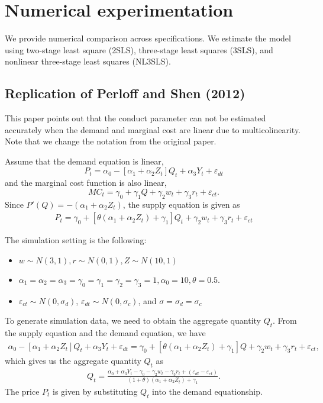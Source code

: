 \documentclass[11pt, a4paper]{article}
\begin{document}
\section{Numerical experimentation}
We provide numerical comparison across specifications. We estimate the model using two-stage least square (2SLS), three-stage least
squares (3SLS), and nonlinear three-stage least squares (NL3SLS).
    
\subsection{Replication of Perloff and Shen (2012)}
This paper points out that the conduct parameter can not be estimated accurately when the demand and marginal cost are linear due to multicolinearity. Note that we change the notation from the original paper.

Assume that the demand equation is linear,
\[P_t = \alpha_0 - [\alpha_1 + \alpha_2Z_t] Q_t + \alpha_3 Y_t + \varepsilon_{dt}\]
and the marginal cost function is also linear, 
\[MC_t = \gamma_0  + \gamma_1 Q + \gamma_2 w_t + \gamma_3 r_t + \varepsilon_{ct}.\]
Since $P'(Q) = -(\alpha_1 + \alpha_2Z_t)$, the supply equation is given as
\begin{align*}
    P_t = \gamma_0 + [\theta(\alpha_1 + \alpha_2Z_t)+ \gamma_1] Q_t   + \gamma_2 w_t + \gamma_3 r_t + \varepsilon_{ct}
\end{align*}

The simulation setting is the following:
\begin{itemize}
    \item $w \sim N (3, 1), r \sim N (0, 1), Z \sim N (10, 1)$
    \item $\alpha_1 = \alpha_2 = \alpha_3 = \gamma_0 = \gamma_1 = \gamma_2  = \gamma_3 = 1, \alpha_0 = 10, \theta = 0.5.$
    \item $\varepsilon_{ct}\sim N(0,\sigma_d)$, $\varepsilon_{dt} \sim N(0,\sigma_c)$, and $\sigma = \sigma_d = \sigma_c$
\end{itemize}

To generate simulation data, we need to obtain the aggregate quantity $Q_t$.
From the supply equation and the demand equation, we have
\begin{align}
    \alpha_0 - [\alpha_1 + \alpha_2Z_t] Q_t + \alpha_3 Y_t + \varepsilon_{dt} = \gamma_0 + [\theta(\alpha_1 + \alpha_2Z_t)+ \gamma_1] Q   + \gamma_2 w_t + \gamma_3 r_t + \varepsilon_{ct},
\end{align}
which gives us the aggregate quantity $Q_t$ as 
\begin{align*}
    Q_t =  \frac{\alpha_0 + \alpha_3 Y_t - \gamma_0 - \gamma_2 w_t - \gamma_3 r_t + (\varepsilon_{dt} - \varepsilon_{ct})}{(1 + \theta) (\alpha_1 + \alpha_2Z_t) + \gamma_1}.
\end{align*}
The price $P_t$ is given by substituting $Q_t$ into the demand equationship.
\end{document}
